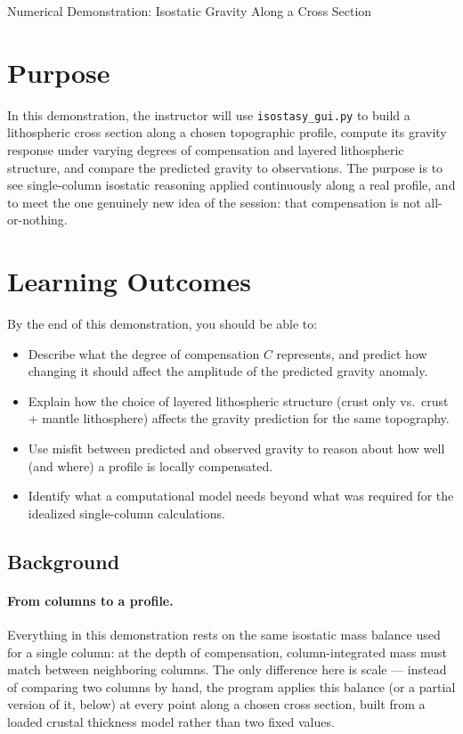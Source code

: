 \begin{activity}{Numerical Demonstration: Isostatic Gravity Along a Cross Section}

\section*{Purpose}

In this demonstration, the instructor will use \texttt{isostasy\_gui.py} to build a lithospheric cross section along a chosen topographic profile, compute its gravity response under varying degrees of compensation and layered lithospheric structure, and compare the predicted gravity to observations. The purpose is to see single-column isostatic reasoning applied continuously along a real profile, and to meet the one genuinely new idea of the session: that compensation is not
all-or-nothing.

\section*{Learning Outcomes}

By the end of this demonstration, you should be able to:
\begin{itemize}
    \item Describe what the degree of compensation $C$ represents, and predict how changing it should affect the amplitude of the predicted gravity anomaly.
    \item Explain how the choice of layered lithospheric structure (crust only vs.\ crust + mantle lithosphere) affects the gravity prediction for the same topography.
    \item Use misfit between predicted and observed gravity to reason about how well (and where) a profile is locally compensated.
    \item Identify what a computational model needs beyond what was required for the idealized single-column calculations.
\end{itemize}

\subsection*{Background}

\paragraph{From columns to a profile.} Everything in this demonstration rests on the same isostatic mass balance used for a single column: at the depth of compensation, column-integrated mass must match between neighboring columns. The only difference here is scale --- instead of comparing two columns by hand, the program applies this balance (or a partial version of it, below) at every point along a chosen cross section, built from a loaded crustal thickness model rather than two fixed values.


\end{activity}
